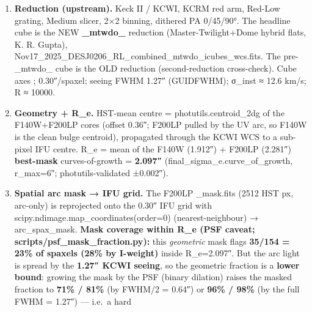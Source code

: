 \documentclass[
]{article}
\providecommand{\tightlist}{%
  \setlength{\itemsep}{0pt}\setlength{\parskip}{0pt}}
\newcommand{\BreakablePath}[1]{{\ttfamily\sloppy #1}}
\begin{document}
\begin{enumerate}
\def\labelenumi{\arabic{enumi}.}
\tightlist
\item
  \textbf{Reduction (upstream).} Keck II / KCWI, KCRM red arm, Red-Low
  grating, Medium slicer, 2×2 binning, dithered PA 0/45/90°. The
  headline cube is the NEW
  \textbf{\BreakablePath{\_\discretionary{}{}{}mtwdo\_\discretionary{}{}{}}}
  reduction (Master-Twilight+Dome hybrid flats, K. R. Gupta),
  \BreakablePath{Nov17\_\discretionary{}{}{}2025\_\discretionary{}{}{}DESJ0206\_\discretionary{}{}{}RL\_\discretionary{}{}{}combined\_\discretionary{}{}{}mtwdo\_\discretionary{}{}{}icubes\_\discretionary{}{}{}wcs.\discretionary{}{}{}fits}.
  The
  pre-\BreakablePath{\_\discretionary{}{}{}mtwdo\_\discretionary{}{}{}}
  cube is the OLD reduction (second-reduction cross-check). Cube axes
  \BreakablePath{[λ, y, x]}; 0.30″/spaxel; seeing FWHM 1.27″
  (\BreakablePath{GUIDFWHM}); σ\_inst ≈ 12.6 km/s; R ≈ 10000.
\item
  \textbf{Geometry + R\_e.} HST-mean centre =
  \BreakablePath{photutils.\discretionary{}{}{}centroid\_\discretionary{}{}{}2dg}
  of the F140W+F200LP cores (offset 0.36″; F200LP pulled by the UV arc,
  so F140W is the clean bulge centroid), propagated through the KCWI WCS
  to a sub-pixel IFU centre. R\_e = mean of the F140W (1.912″) + F200LP
  (2.281″) \textbf{best-mask} curves-of-growth = \textbf{2.097″}
  (\BreakablePath{final\_\discretionary{}{}{}sigma\_\discretionary{}{}{}e.\discretionary{}{}{}curve\_\discretionary{}{}{}of\_\discretionary{}{}{}growth},
  r\_max=6″; photutils-validated ±0.002″).
\item
  \textbf{Spatial arc mask → IFU grid.} The F200LP
  \BreakablePath{\_\discretionary{}{}{}mask.\discretionary{}{}{}fits}
  (2512 HST px, arc-only) is reprojected onto the 0.30″ IFU grid with
  \BreakablePath{scipy.\discretionary{}{}{}ndimage.\discretionary{}{}{}map\_\discretionary{}{}{}coordinates(order=0)}
  (nearest-neighbour) →
  \BreakablePath{arc\_\discretionary{}{}{}spax\_\discretionary{}{}{}mask}.
  \textbf{Mask coverage within R\_e (PSF caveat;
  \BreakablePath{scripts/\discretionary{}{}{}psf\_\discretionary{}{}{}mask\_\discretionary{}{}{}fraction.\discretionary{}{}{}py}):}
  this \emph{geometric} mask flags \textbf{35/154 = 23\% of spaxels
  (28\% by I-weight)} inside R\_e=2.097″. But the arc light is spread by
  the \textbf{1.27″ KCWI seeing}, so the geometric fraction is a
  \textbf{lower bound}: growing the mask by the PSF (binary dilation)
  raises the masked fraction to \textbf{71\% / 81\%} (by FWHM/2 = 0.64″)
  or \textbf{96\% / 98\%} (by the full FWHM = 1.27″) --- i.e.~a hard

\end{enumerate}
\end{document}
